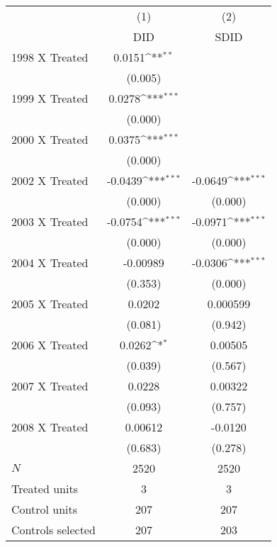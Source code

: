 {
\def\sym#1{\ifmmode^{#1}\else\(^{#1}\)\fi}
\begin{tabular}{l*{2}{c}}
\hline\hline
          &\multicolumn{1}{c}{(1)}&\multicolumn{1}{c}{(2)}\\
          &\multicolumn{1}{c}{DID}&\multicolumn{1}{c}{SDID}\\
\hline
1998 X Treated&   0.0151\sym{**} &                  \\
          &  (0.005)         &                  \\
[1em]
1999 X Treated&   0.0278\sym{***}&                  \\
          &  (0.000)         &                  \\
[1em]
2000 X Treated&   0.0375\sym{***}&                  \\
          &  (0.000)         &                  \\
[1em]
2002 X Treated&  -0.0439\sym{***}&  -0.0649\sym{***}\\
          &  (0.000)         &  (0.000)         \\
[1em]
2003 X Treated&  -0.0754\sym{***}&  -0.0971\sym{***}\\
          &  (0.000)         &  (0.000)         \\
[1em]
2004 X Treated& -0.00989         &  -0.0306\sym{***}\\
          &  (0.353)         &  (0.000)         \\
[1em]
2005 X Treated&   0.0202         & 0.000599         \\
          &  (0.081)         &  (0.942)         \\
[1em]
2006 X Treated&   0.0262\sym{*}  &  0.00505         \\
          &  (0.039)         &  (0.567)         \\
[1em]
2007 X Treated&   0.0228         &  0.00322         \\
          &  (0.093)         &  (0.757)         \\
[1em]
2008 X Treated&  0.00612         &  -0.0120         \\
          &  (0.683)         &  (0.278)         \\
\hline
\(N\)     &     2520         &     2520         \\
Treated units&        3         &        3         \\
Control units&      207         &      207         \\
Controls selected&      207         &      203         \\
\hline\hline
\end{tabular}
}
